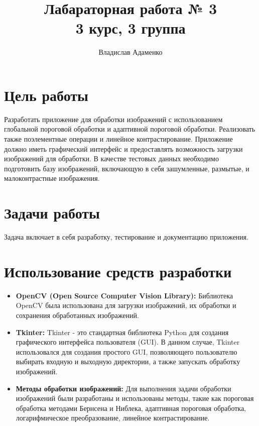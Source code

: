 \documentclass{article}
\begin{document}
    \title{Лабараторная работа № 3\\ 3 курс, 3 группа}
    \author{Владислав Адаменко}
    \maketitle
    
    \section{Цель работы}
        Разработать приложение для обработки изображений с использованием глобальной пороговой обработки и адаптивной пороговой обработки.
        Реализовать также поэлементные операции и линейное контрастирование.
        Приложение должно иметь графический интерфейс и предоставлять возможность загрузки изображений для обработки.
        В качестве тестовых данных необходимо подготовить базу изображений, включающую в себя зашумленные, размытые, и малоконтрастные изображения.

    \section{Задачи работы}
        Задача включает в себя разработку, тестирование и документацию приложения.

    \section{Использование средств разработки}
    \begin{itemize}
        \item \textbf{OpenCV (Open Source Computer Vision Library):} Библиотека OpenCV была использована для загрузки изображений, их обработки и сохранения обработанных изображений.

        \item \textbf{Tkinter:} Tkinter - это стандартная библиотека Python для создания графического интерфейса пользователя (GUI). В данном случае, Tkinter использовался для создания простого GUI, позволяющего пользователю выбирать входную и выходную директории, а также запускать обработку изображений.

        \item \textbf{Методы обработки изображений:} Для выполнения задачи обработки изображений были разработаны и использованы методы, такие как пороговая обработка методами Бернсена и Ниблека, адаптивная пороговая обработка, логарифмическое преобразование, линейное контрастирование.
    \end{itemize}
\end{document}
